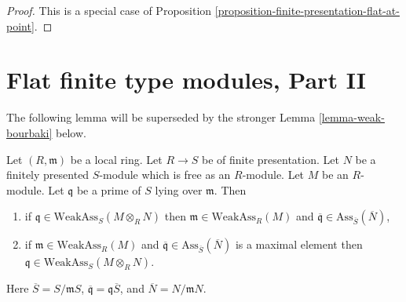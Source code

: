 \begin{proof}
This is a special case of
Proposition \ref{proposition-finite-presentation-flat-at-point}.
\end{proof}







\section{Flat finite type modules, Part II}
\label{section-finite-type-flat-II}

\noindent
The following lemma will be superseded by the stronger
Lemma \ref{lemma-weak-bourbaki}
below.

\begin{lemma}
\label{lemma-weak-bourbaki-pre}
Let $(R, \mathfrak m)$ be a local ring.
Let $R \to S$ be of finite presentation.
Let $N$ be a finitely presented $S$-module which is free as an $R$-module.
Let $M$ be an $R$-module.
Let $\mathfrak q$ be a prime of $S$ lying over $\mathfrak m$.
Then
\begin{enumerate}
\item if $\mathfrak q \in \text{WeakAss}_S(M \otimes_R N)$
then $\mathfrak m \in \text{WeakAss}_R(M)$ and
$\overline{\mathfrak q} \in \text{Ass}_{\overline{S}}(\overline{N})$,
\item if $\mathfrak m \in \text{WeakAss}_R(M)$ and
$\overline{\mathfrak q} \in \text{Ass}_{\overline{S}}(\overline{N})$
is a maximal element then $\mathfrak q \in \text{WeakAss}_S(M \otimes_R N)$.
\end{enumerate}
Here $\overline{S} = S/\mathfrak m S$,
$\overline{\mathfrak q} = \mathfrak q \overline{S}$, and
$\overline{N} = N/\mathfrak m N$.
\end{lemma}

